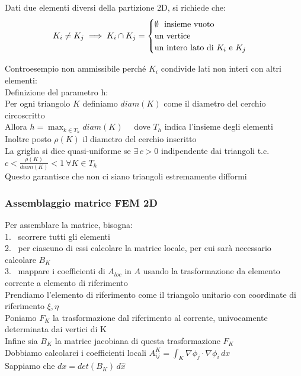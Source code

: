 \documentclass{article}
\let \oldexists \exists
\renewcommand{\exists}{\oldexists\,}
\begin{document}
Dati due elementi diversi della partizione 2D, si richiede che:
\[
K_i\ne K_j \implies K_i\cap K_j = \begin{cases}
    \emptyset \ \text{ insieme vuoto}\\
    \text{un vertice}\\
    \text{un intero lato di } K_i \text{ e } K_j
\end{cases}
\]
\phantom{}

Controesempio non ammissibile perché $K_i$ condivide lati non interi con altri elementi:
\phantom{}\\

Definizione del parametro h:\\
Per ogni triangolo $K$ definiamo $diam(K)$ come il diametro del cerchio circoscritto\\
Allora $h=\displaystyle \max_{k\in T_h} diam(K)$ \ \ dove $T_h$ indica l'insieme degli elementi\\
Inoltre posto $\rho(K)$ il diametro del cerchio inscritto\\
La griglia si dice quasi-uniforme se $\exists c>0$ indipendente dai triangoli t.c. $c<\frac{\rho(K)}{diam(K)}<1 \ \forall K\in T_h$\\
Questo garantisce che non ci siano triangoli estremamente difformi\\


\subsubsection*{Assemblaggio matrice FEM 2D}

Per assemblare la matrice, bisogna:\\
1. \ scorrere tutti gli elementi\\
2. \ per ciascuno di essi calcolare la matrice locale, per cui sarà necessario calcolare $B_K$\\
3. \ mappare i coefficienti di $A_{loc}$ in $A$ usando la trasformazione da elemento corrente a elemento di riferimento \\

Prendiamo l'elemento di riferimento come il triangolo unitario con coordinate di riferimento $\xi,\eta$\\
Poniamo $F_K$ la trasformazione dal riferimento al corrente, univocamente determinata dai vertici di K\\
Infine sia $B_K$ la matrice jacobiana di questa trasformazione $F_K$\\

Dobbiamo calcolarci i coefficienti locali $A_{ij}^K=\int_K \nabla \phi_j \cdot \nabla \phi_i\, dx$ \\
Sappiamo che $dx= det(B_K)\,d\hat{x}$\\
\end{document}
